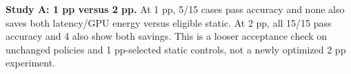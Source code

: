 \textbf{Study A: 1 pp versus 2 pp.} At 1 pp, 5/15 cases pass accuracy and none also saves both latency/GPU energy versus eligible static. At 2 pp, all 15/15 pass accuracy and 4 also show both savings. This is a looser acceptance check on unchanged policies and 1 pp-selected static controls, not a newly optimized 2 pp experiment.
